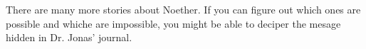 
There are many more stories about Noether. If you can figure out which ones are possible and whiche are impossible, you might be able to deciper the mesage hidden in Dr. Jonas' journal.
